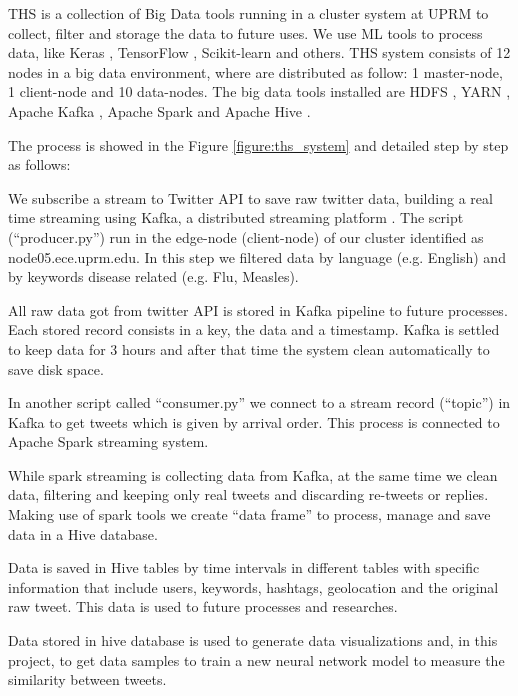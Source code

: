 \documentclass[12pt]{report}
\begin{document}
\ac{THS} is a collection of Big Data tools running in a cluster system at \ac{UPRM} to collect, filter and storage the data to future uses. We use \ac{ML} tools to process data, like Keras \cite{Keras2019}, TensorFlow \cite{Tensor2019}, Scikit-learn and others. \ac{THS} system consists of 12 nodes in a big data environment, where are distributed as follow: 1 master-node, 1 client-node and 10 data-nodes. The big data tools installed are \ac{HDFS} \cite{Hadoop2019}, \ac{YARN} \cite{Hadoop2019},  Apache Kafka \cite{Kafka2019}, Apache Spark \cite{Spark2019} and Apache Hive \cite{Hive2019}.

The process is showed in the Figure \ref{figure:ths_system} and detailed step by step as follows:

\begin{steps}
\item We subscribe a stream to Twitter \ac{API} to save raw twitter data, building a real time streaming using Kafka, a distributed streaming platform \cite{Kafka2019}. The script (``producer.py'') run in the edge-node (client-node) of our cluster identified as node05.ece.uprm.edu. In this step we filtered data by language (e.g. English) and by keywords disease related (e.g. Flu, Measles).

\item All raw data got from twitter \ac{API} is stored in Kafka pipeline to future processes. Each stored record consists in a key, the data and a timestamp. Kafka is settled to keep data for 3 hours and after that time the system clean automatically to save disk space. 

\item In another script called ``consumer.py'' we connect to a stream record (``topic'') in Kafka to get tweets which is given by arrival order. This process is connected to Apache Spark streaming system.

\item While spark streaming is collecting data from Kafka, at the same time we clean data, filtering and keeping only real tweets and discarding re-tweets or replies. Making use of spark tools we create ``data frame'' to process, manage and save data in a Hive database.

\item Data is saved in Hive tables by time intervals in different tables with specific information that include users, keywords, hashtags, geolocation and the original raw tweet. This data is used to future processes and researches.

\item Data stored in hive database is used to generate data visualizations and, in this project, to get data samples to train a new neural network model to measure the similarity between tweets.

\end{steps}
\end{document}
